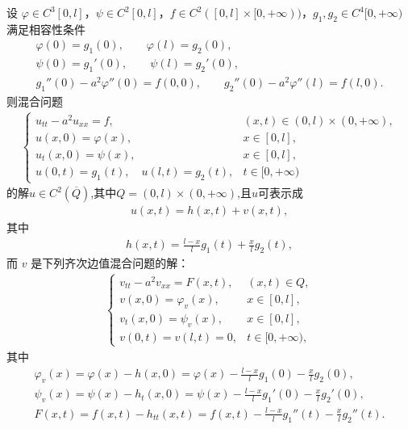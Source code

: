 \documentclass[../../main.tex]{subfiles}%
\begin{document}
\begin{theorem}
\label{theorem:mixed-nonhom-bc}
设 $\varphi\in C^3[0,l]$，$\psi\in C^2[0,l]$，$f\in C^2([0,l]\times[0,+\infty))$，$g_1,g_2\in C^4[0,+\infty)$ 满足相容性条件
\begin{gather}
\varphi(0)=g_1(0),\qquad \varphi(l)=g_2(0), \label{eq:comp-bc1} \\
\psi(0)=g_1'(0),\qquad \psi(l)=g_2'(0), \label{eq:comp-bc2} \\
g_1''(0)-a^2\varphi''(0)=f(0,0),\qquad g_2''(0)-a^2\varphi''(l)=f(l,0). \label{eq:comp-bc3}
\end{gather}
则混合问题
\begin{align}
\begin{cases}
u_{tt}-a^2u_{xx}=f, & (x,t)\in(0,l)\times(0,+\infty), \\
u(x,0)=\varphi(x), & x\in[0,l], \\
u_t(x,0)=\psi(x), & x\in[0,l], \\
u(0,t)=g_1(t),\quad u(l,t)=g_2(t), & t\in[0,+\infty)
\end{cases} \label{eq:mixed-nonhom-bc}
\end{align}
的解$u\in C^2(\overline{Q})$,其中$Q=(0,l)\times(0,+\infty)$,且$u$可表示成
\begin{align}
u(x,t)=h(x,t)+v(x,t), \label{eq:mixed-sol-bc}
\end{align}
其中
\begin{align}
h(x,t)=\frac{l-x}{l}g_1(t)+\frac{x}{l}g_2(t), \label{eq:h-def}
\end{align}
而 $v$ 是下列齐次边值混合问题的解：
\begin{align}
\begin{cases}
v_{tt}-a^2v_{xx}=F(x,t), & (x,t)\in Q, \\
v(x,0)=\varphi_v(x), & x\in[0,l], \\
v_t(x,0)=\psi_v(x), & x\in[0,l], \\
v(0,t)=v(l,t)=0, & t\in[0,+\infty),
\end{cases} \label{eq:v-exercise}
\end{align}
其中
\begin{gather*}
\varphi_v(x)=\varphi(x)-h(x,0)=\varphi(x)-\frac{l-x}{l}g_1(0)-\frac{x}{l}g_2(0),  \\
\psi_v(x)=\psi(x)-h_t(x,0)=\psi(x)-\frac{l-x}{l}g_1'(0)-\frac{x}{l}g_2'(0),  \\
F(x,t)=f(x,t)-h_{tt}(x,t)=f(x,t)-\frac{l-x}{l}g_1''(t)-\frac{x}{l}g_2''(t).
\end{gather*}

\end{theorem}
\end{document}
